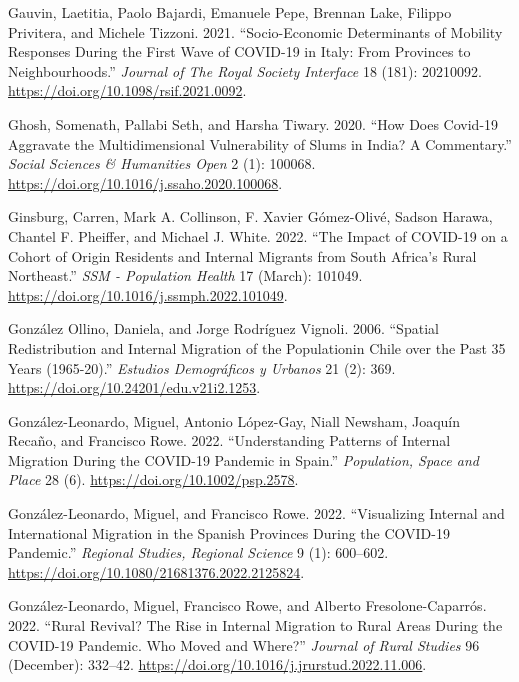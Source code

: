 \documentclass[
  11pt,
]{article}
\newlength{\cslhangindent}
\newlength{\cslentryspacingunit} %
\newenvironment{CSLReferences}[2] %
 {%
  \setlength{\parindent}{0pt}
  \ifodd #1
  \let\oldpar\par
  \def\par{\hangindent=\cslhangindent\oldpar}
  \fi
  \setlength{\parskip}{#2\cslentryspacingunit}
 }%
 {}
\begin{document}
\begin{CSLReferences}{1}{0}
\leavevmode{}%
Gauvin, Laetitia, Paolo Bajardi, Emanuele Pepe, Brennan Lake, Filippo
Privitera, and Michele Tizzoni. 2021. {``Socio-Economic Determinants of
Mobility Responses During the First Wave of COVID-19 in Italy: From
Provinces to Neighbourhoods.''} \emph{Journal of The Royal Society
Interface} 18 (181): 20210092.
\url{https://doi.org/10.1098/rsif.2021.0092}.

\leavevmode{}%
Ghosh, Somenath, Pallabi Seth, and Harsha Tiwary. 2020. {``How Does
Covid-19 Aggravate the Multidimensional Vulnerability of Slums in India?
A Commentary.''} \emph{Social Sciences \& Humanities Open} 2 (1):
100068. \url{https://doi.org/10.1016/j.ssaho.2020.100068}.

\leavevmode{}%
Ginsburg, Carren, Mark A. Collinson, F. Xavier Gómez-Olivé, Sadson
Harawa, Chantel F. Pheiffer, and Michael J. White. 2022. {``The Impact
of COVID-19 on a Cohort of Origin Residents and Internal Migrants from
South Africa's Rural Northeast.''} \emph{SSM - Population Health} 17
(March): 101049. \url{https://doi.org/10.1016/j.ssmph.2022.101049}.

\leavevmode{}%
González Ollino, Daniela, and Jorge Rodríguez Vignoli. 2006. {``Spatial
Redistribution and Internal Migration of the Populationin Chile over the
Past 35 Years (1965-20).''} \emph{Estudios Demográficos y Urbanos} 21
(2): 369. \url{https://doi.org/10.24201/edu.v21i2.1253}.

\leavevmode{}%
González-Leonardo, Miguel, Antonio López-Gay, Niall Newsham, Joaquín
Recaño, and Francisco Rowe. 2022. {``Understanding Patterns of Internal
Migration During the COVID{-}19 Pandemic in Spain.''} \emph{Population,
Space and Place} 28 (6). \url{https://doi.org/10.1002/psp.2578}.

\leavevmode{}%
González-Leonardo, Miguel, and Francisco Rowe. 2022. {``Visualizing
Internal and International Migration in the Spanish Provinces During the
COVID-19 Pandemic.''} \emph{Regional Studies, Regional Science} 9 (1):
600--602. \url{https://doi.org/10.1080/21681376.2022.2125824}.

\leavevmode{}%
González-Leonardo, Miguel, Francisco Rowe, and Alberto
Fresolone-Caparrós. 2022. {``Rural Revival? The Rise in Internal
Migration to Rural Areas During the COVID-19 Pandemic. Who Moved and
Where?''} \emph{Journal of Rural Studies} 96 (December): 332--42.
\url{https://doi.org/10.1016/j.jrurstud.2022.11.006}.


\end{CSLReferences}
\end{document}
